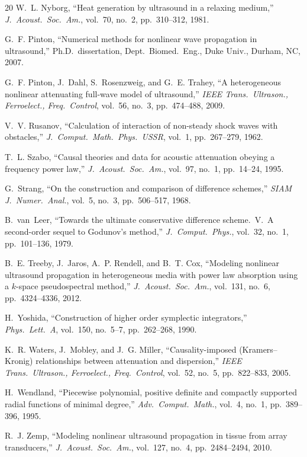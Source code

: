 \documentclass[11pt]{article}
\begin{document}
\begin{thebibliography}{20}
W.~L. Nyborg,
``Heat generation by ultrasound in a relaxing medium,''
\textit{J.\ Acoust.\ Soc.\ Am.}, vol.~70, no.~2, pp.~310--312, 1981.

G.~F. Pinton,
``Numerical methods for nonlinear wave propagation in ultrasound,''
Ph.D.\ dissertation, Dept.\ Biomed.\ Eng., Duke Univ., Durham, NC, 2007.

G.~F. Pinton, J.~Dahl, S.~Rosenzweig, and G.~E. Trahey,
``A heterogeneous nonlinear attenuating full-wave model of ultrasound,''
\textit{IEEE Trans.\ Ultrason., Ferroelect., Freq.\ Control},
vol.~56, no.~3, pp.~474--488, 2009.

V.~V. Rusanov,
``Calculation of interaction of non-steady shock waves with obstacles,''
\textit{J.\ Comput.\ Math.\ Phys.\ USSR}, vol.~1, pp.~267--279, 1962.

T.~L. Szabo,
``Causal theories and data for acoustic attenuation obeying a
frequency power law,''
\textit{J.\ Acoust.\ Soc.\ Am.}, vol.~97, no.~1, pp.~14--24, 1995.

G.~Strang,
``On the construction and comparison of difference schemes,''
\textit{SIAM J.\ Numer.\ Anal.}, vol.~5, no.~3, pp.~506--517, 1968.

B.~van~Leer,
``Towards the ultimate conservative difference scheme.~V.~A
second-order sequel to Godunov's method,''
\textit{J.\ Comput.\ Phys.}, vol.~32, no.~1, pp.~101--136, 1979.

B.~E. Treeby, J.~Jaros, A.~P. Rendell, and B.~T. Cox,
``Modeling nonlinear ultrasound propagation in heterogeneous media
with power law absorption using a $k$-space pseudospectral method,''
\textit{J.\ Acoust.\ Soc.\ Am.}, vol.~131, no.~6, pp.~4324--4336, 2012.

H.~Yoshida,
``Construction of higher order symplectic integrators,''
\textit{Phys.\ Lett.\ A}, vol.~150, no.~5--7, pp.~262--268, 1990.

K.~R. Waters, J.~Mobley, and J.~G. Miller,
``Causality-imposed (Kramers--Kronig) relationships between
attenuation and dispersion,''
\textit{IEEE Trans.\ Ultrason., Ferroelect., Freq.\ Control},
vol.~52, no.~5, pp.~822--833, 2005.

H.~Wendland,
``Piecewise polynomial, positive definite and compactly supported
radial functions of minimal degree,''
\textit{Adv.\ Comput.\ Math.}, vol.~4, no.~1, pp.~389--396, 1995.

R.~J. Zemp,
``Modeling nonlinear ultrasound propagation in tissue from array
transducers,''
\textit{J.\ Acoust.\ Soc.\ Am.}, vol.~127, no.~4, pp.~2484--2494, 2010.

\end{thebibliography}
\end{document}
